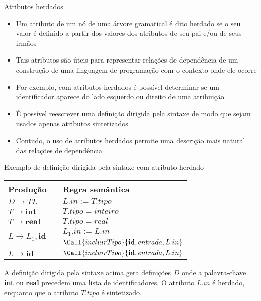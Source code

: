\begin{frame}[fragile]{Atributos herdados}

    \begin{itemize}
        \item Um atributo de um nó de uma árvore gramatical é dito herdado se o seu valor é definido a partir dos valores dos atributos
            de seu pai e/ou de seus irmãos
        \pause

        \item Tais atributos são úteis para representar relações de dependência de um construção de uma linguagem de programação com
            o contexto onde ele ocorre
        \pause

        \item Por exemplo, com atributos herdados é possível determinar se um identificador aparece do lado esquerdo ou direito de
            uma atribuição
        \pause

        \item É possível reescrever uma definição dirigida pela sintaxe de modo que sejam usados apenas atributos sintetizados
        \pause

        \item Contudo, o uso de atributos herdados permite uma descrição mais natural das relações de dependência
    \end{itemize}

\end{frame}

\begin{frame}[fragile]{Exemplo de definição dirigida pela sintaxe com atributo herdado}

    \begin{table}
        \centering
        \begin{tabular}{lp{2cm}l} 
        \toprule
        \textbf{Produção} & & \textbf{Regra semântica} \\
        \midrule
        \rowcolor[gray]{0.9}
        $D\to TL$ & & $L.in := T.tipo$ \\
        $T\to \textbf{int}$ & & $T.tipo = inteiro$ \\
        \rowcolor[gray]{0.9}
        $T\to \textbf{real}$ & & $T.tipo = real$ \\
        \multirow{2}{*}{$L\to L_1, \textbf{id}$} & & $L_1.in := L.in$ \\
        & & $\Call{incluirTipo}{\textbf{id}, entrada, L.in}$ \\
        \rowcolor[gray]{0.9}
        $L\to \textbf{id}$ & & $\Call{incluirTipo}{\textbf{id}, entrada, L.in}$ \\
        \bottomrule
        \end{tabular}
    \end{table}

    \vspace{0.2in}

    A definição dirigida pela sintaxe acima gera definições $D$ onde a palavra-chave \textbf{int} ou \textbf{real} precedem uma lista
        de identificadores. O atributo $L.in$ é herdado, enquanto que o atributo $T.tipo$ é sintetizado.
\end{frame}

